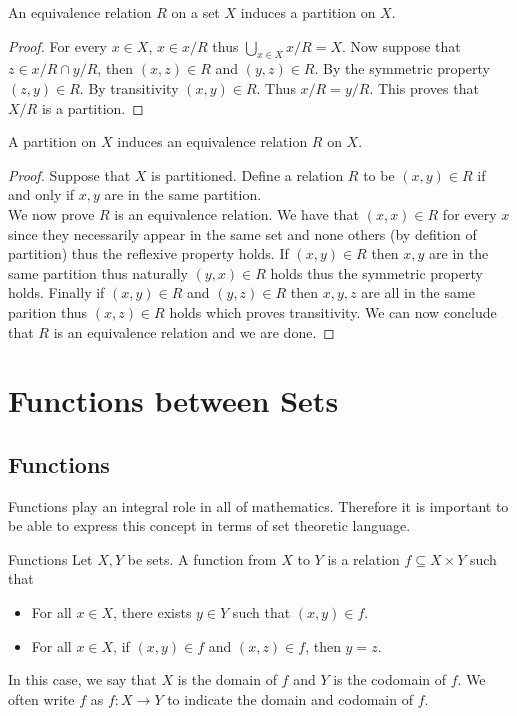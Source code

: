 \documentclass[a4paper]{article}
\begin{document}
\begin{thm}{}{} An equivalence relation $R$ on a set $X$ induces a partition on $X$. 
\begin{proof}
For every $x\in X$, $x\in x/R$ thus $\bigcup_{x\in X}x/R=X$. Now suppose that $z\in x/R\cap y/R$, then $(x,z)\in R$ and $(y,z)\in R$. By the symmetric property $(z,y)\in R$. By transitivity $(x,y)\in R$. Thus $x/R=y/R$. This proves that $X/R$ is a partition. 
\end{proof}
\end{thm}

\begin{thm}{}{} A partition on $X$ induces an equivalence relation $R$ on $X$. 
\begin{proof} Suppose that $X$ is partitioned. Define a relation $R$ to be $(x,y)\in R$ if and only if $x,y$ are in the same partition. \\

We now prove $R$ is an equivalence relation. We have that $(x,x)\in R$ for every $x$ since they necessarily appear in the same set and none others (by defition of partition) thus the reflexive property holds. If $(x,y)\in R$ then $x,y$ are in the same partition thus naturally $(y,x)\in R$ holds thus the symmetric property holds. Finally if $(x,y)\in R$ and $(y,z)\in R$ then $x,y,z$ are all in the same parition thus $(x,z)\in R$ holds which proves transitivity. We can now conclude that $R$ is an equivalence relation and we are done. 
\end{proof}
\end{thm}

\pagebreak
\section{Functions between Sets}
\subsection{Functions}
Functions play an integral role in all of mathematics. Therefore it is important to be able to express this concept in terms of set theoretic language. 
\begin{defn}{Functions}{} Let $X,Y$ be sets. A function from $X$ to $Y$ is a relation $f\subseteq X\times Y$ such that
\begin{itemize}
\item For all $x\in X$, there exists $y\in Y$ such that $(x,y)\in f$. 
\item For all $x\in X$, if $(x,y)\in f$ and $(x,z)\in f$, then $y=z$. 
\end{itemize}
In this case, we say that $X$ is the domain of $f$ and $Y$ is the codomain of $f$. We often write $f$ as $f:X\to Y$ to indicate the domain and codomain of $f$. 
\end{defn}
\end{document}

